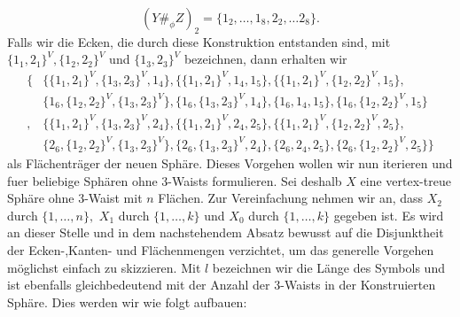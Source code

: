 \documentclass[12pt,titlepage,twoside,cleardoublepage]{article}
\theoremstyle{nummermitklammern}
\numberwithin{equation}{section}
\begin{document}
 \[
(Y\#_{\phi} Z)_2=\{1_2,\ldots,1_8,2_2,\ldots 2_8\}. 
 \]
 Falls wir die Ecken, die durch diese Konstruktion entstanden sind, mit $\{1_1,2_1\}^V,\{1_2,2_2\}^V$ und $\{1_3,2_3\}^V$ bezeichnen, dann erhalten wir 
\begin{align*}
\{&\{\{1_1,2_1\}^V,\{1_3,2_3\}^V,1_4\},\{\{1_1,2_1\}^V,1_4,1_5\},\{\{1_1,2_1\}^V,\{1_2,2_2\}^V,1_5\},\\
&\{1_6,\{1_2,2_2\}^V,\{1_3,2_3\}^V\},\{1_6,\{1_3,2_3\}^V,1_4\},\{1_6,1_4,1_5\},\{1_6,\{1_2,2_2\}^V,1_5\}\\
,&\{\{1_1,2_1\}^V,\{1_3,2_3\}^V,2_4\},\{\{1_1,2_1\}^V,2_4,2_5\},\{\{1_1,2_1\}^V,\{1_2,2_2\}^V,2_5\},\\
&\{2_6,\{1_2,2_2\}^V,\{1_3,2_3\}^V\},\{2_6,\{1_3,2_3\}^V,2_4\},\{2_6,2_4,2_5\},\{2_6,\{1_2,2_2\}^V,2_5\}\}
\end{align*}
 als Flächenträger der neuen Sphäre.
 Dieses Vorgehen wollen wir nun iterieren und fuer beliebige Sphären ohne 3-Waists formulieren.
 Sei deshalb $X$ eine vertex-treue Sphäre ohne 3-Waist mit $n$ Flächen. Zur Vereinfachung nehmen wir an, dass $X_2$ durch $\{1,\ldots,n\},$ $X_1$ durch $\{1,\ldots,k\}$ und $X_0$ durch $\{1,\ldots,k\}$ gegeben ist. Es wird an dieser Stelle und in dem nachstehendem Absatz bewusst auf die Disjunktheit der Ecken-,Kanten- und Flächenmengen verzichtet, um das generelle Vorgehen möglichst einfach zu skizzieren. Mit $l$ bezeichnen wir die Länge des Symbols und ist ebenfalls gleichbedeutend mit der Anzahl der 3-Waists in der Konstruierten Sphäre. Dies werden wir wie folgt aufbauen:
\end{document}
